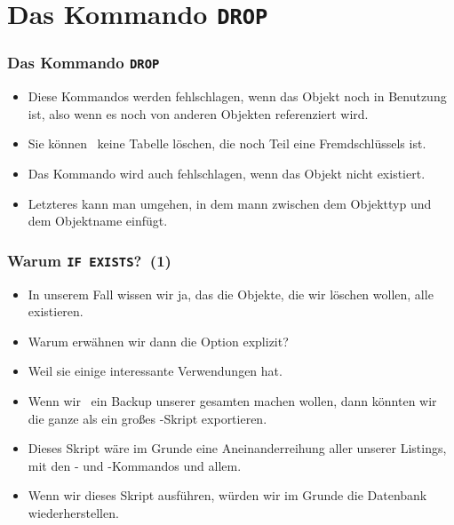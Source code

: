 \documentclass[aspectratio=169,mathserif,notheorems]{beamer}%
\begin{document}
\section{Das Kommando \texttt{DROP}}%
%
\begin{frame}[t]%
\frametitle{Das Kommando \texttt{DROP}}%
%
\parbox{0.4\paperwidth}{\small{%
\begin{itemize}%
%
%
%
%
%
%
%
\item<4-> Diese Kommandos werden fehlschlagen, wenn das Objekt noch in Benutzung ist, also wenn es noch von anderen Objekten referenziert wird.%
%
\item<5-> Sie können \DEzB\ keine Tabelle löschen, die noch Teil eine Fremdschlüssels ist.%
%
\item<6-> Das Kommando wird auch fehlschlagen, wenn das Objekt nicht existiert.%
%
\item<7-> Letzteres kann man umgehen, in dem mann  zwischen dem Objekttyp und dem Objektname einfügt.%
%
\end{itemize}%
}}%
%
%
%
\end{frame}%
%
\begin{frame}%
\frametitle{Warum \texttt{IF EXISTS}?~(1)}%
\begin{itemize}%
\item In unserem Fall wissen wir ja, das die Objekte, die wir löschen wollen, alle existieren.%
%
\item<2-> Warum erwähnen wir dann die Option  explizit?%
%
\item<3-> Weil sie einige interessante Verwendungen hat.\cite{PGDG:PD:SD}%
%
\item<4-> Wenn wir \DEzB\ ein Backup unserer gesamten  machen wollen, dann könnten wir die ganze  als ein großes -Skript exportieren.%
%
\item<5-> Dieses Skript wäre im Grunde eine Aneinanderreihung aller unserer Listings, mit den - und -Kommandos und allem.%
%
\item<6-> Wenn wir dieses Skript ausführen, würden wir im Grunde die Datenbank wiederherstellen.%
\end{itemize}%
\end{frame}%
\end{document}
